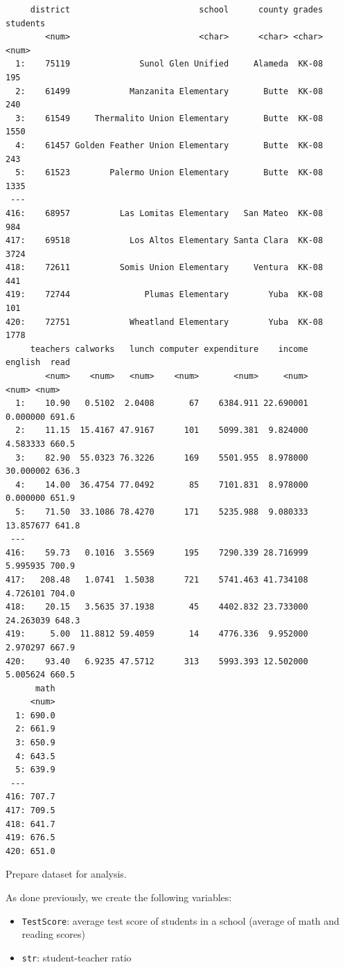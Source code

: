 \documentclass[
  12pt,
  letterpaper,
]{scrbook}
\providecommand{\tightlist}{%
  \setlength{\itemsep}{0pt}\setlength{\parskip}{0pt}}
\renewcommand{\tightlist}{\setlength{\itemsep}{0.5\baselineskip}\setlength{\parskip}{0.2\baselineskip}}
\theoremstyle{definition}
\theoremstyle{plain}
\theoremstyle{remark}
\begin{document}
\begin{verbatim}
     district                          school      county grades students
        <num>                          <char>      <char> <char>    <num>
  1:    75119              Sunol Glen Unified     Alameda  KK-08      195
  2:    61499            Manzanita Elementary       Butte  KK-08      240
  3:    61549     Thermalito Union Elementary       Butte  KK-08     1550
  4:    61457 Golden Feather Union Elementary       Butte  KK-08      243
  5:    61523        Palermo Union Elementary       Butte  KK-08     1335
 ---                                                                     
416:    68957          Las Lomitas Elementary   San Mateo  KK-08      984
417:    69518            Los Altos Elementary Santa Clara  KK-08     3724
418:    72611          Somis Union Elementary     Ventura  KK-08      441
419:    72744               Plumas Elementary        Yuba  KK-08      101
420:    72751            Wheatland Elementary        Yuba  KK-08     1778
     teachers calworks   lunch computer expenditure    income   english  read
        <num>    <num>   <num>    <num>       <num>     <num>     <num> <num>
  1:    10.90   0.5102  2.0408       67    6384.911 22.690001  0.000000 691.6
  2:    11.15  15.4167 47.9167      101    5099.381  9.824000  4.583333 660.5
  3:    82.90  55.0323 76.3226      169    5501.955  8.978000 30.000002 636.3
  4:    14.00  36.4754 77.0492       85    7101.831  8.978000  0.000000 651.9
  5:    71.50  33.1086 78.4270      171    5235.988  9.080333 13.857677 641.8
 ---                                                                         
416:    59.73   0.1016  3.5569      195    7290.339 28.716999  5.995935 700.9
417:   208.48   1.0741  1.5038      721    5741.463 41.734108  4.726101 704.0
418:    20.15   3.5635 37.1938       45    4402.832 23.733000 24.263039 648.3
419:     5.00  11.8812 59.4059       14    4776.336  9.952000  2.970297 667.9
420:    93.40   6.9235 47.5712      313    5993.393 12.502000  5.005624 660.5
      math
     <num>
  1: 690.0
  2: 661.9
  3: 650.9
  4: 643.5
  5: 639.9
 ---      
416: 707.7
417: 709.5
418: 641.7
419: 676.5
420: 651.0
\end{verbatim}

Prepare dataset for analysis.

As done previously, we create the following variables:

\begin{itemize}
\tightlist
\item
  \texttt{TestScore}: average test score of students in a school
  (average of math and reading scores)
\item
  \texttt{str}: student-teacher ratio
\end{itemize}
\end{document}

